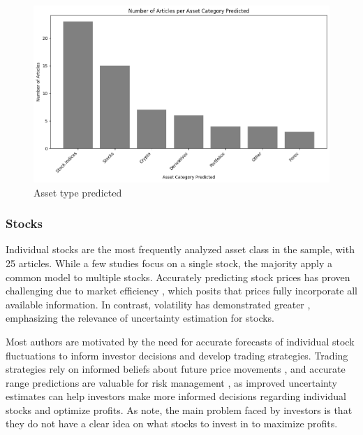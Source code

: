 \begin{figure}[H]
    \centering
    \includegraphics[width=1\linewidth]{Images/articles_per_asset_type_predicted.png}
    \caption{Asset type predicted}
    \label{fig:asset_type_predicted}
\end{figure}
\makeatletter




\subsubsection{Stocks}
Individual stocks are the most frequently analyzed asset class in the sample, with 25 articles. While a few studies focus on a single stock, the majority apply a common model to multiple stocks. Accurately predicting stock prices has proven challenging due to market efficiency \parencite{fama1970efficient}, which posits that prices fully incorporate all available information. In contrast, volatility has demonstrated greater  \parencite{poon2003forecasting}, emphasizing the relevance of uncertainty estimation for stocks. 

Most authors are motivated by the need for accurate forecasts of individual stock fluctuations to inform investor decisions and develop trading strategies. Trading strategies rely on informed beliefs about future price movements \parencite{vuletic2024finGAN}, and accurate range predictions are valuable for risk management \parencite{Li2024DeepAR}, as improved uncertainty estimates can help investors make more informed decisions regarding individual stocks and optimize profits. As \cite{govindasamy2014prediction} note, the main problem faced by investors is that they do not have a clear idea on what stocks to invest in to maximize profits.  

